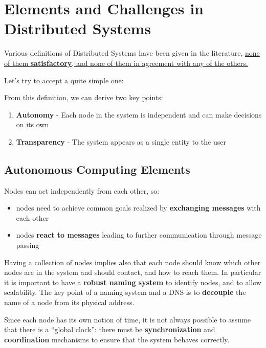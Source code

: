 \chapter{Elements and Challenges in Distributed Systems}

Various definitions of Distributed Systems have been given in the literature, \ul{none of them \textbf{satisfactory}, and none of them in agreement with any of the others.}

Let’s try to accept a quite simple one:

From this definition, we can derive two key points:
\begin{enumerate}
   \item \textbf{Autonomy} - Each node in the system is independent and can make decisions on its own
   \item \textbf{Transparency} - The system appears as a single entity to the user
\end{enumerate}

\section{Autonomous Computing Elements}
{Nodes can act independently from each other, so:\ns
\begin{itemize}
   \item nodes need to achieve common goals realized by \textbf{exchanging messages} with
   each other
   \item nodes \textbf{react to messages} leading to further communication through message passing
\end{itemize}}

Having a collection of nodes implies also that each node should know which other nodes are in the system and should contact, and how to reach them.
In particular it is important to have a \textbf{robust naming system} to identify nodes, and to allow scalability.
The key point of a naming system and a DNS is to \textbf{decouple} the name of a node from its physical address.


Since each node has its own notion of time, it is not always possible to assume that there is a ``global clock'':
there must be \textbf{synchronization} and \textbf{coordination} mechanisms to ensure that the system behaves correctly.

